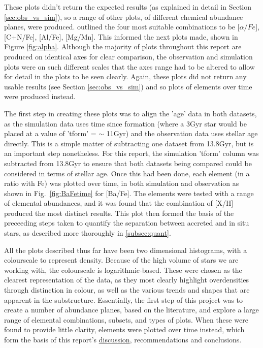 \documentclass[fleqn,usenatbib]{mnras}
\begin{document}
These plots didn't return the expected results (as explained in detail in Section \ref{sec:obs_vs_sim}), so a range of other plots, of different chemical abundance planes, were produced. \citet{Hawkins2015} outlined the four most suitable combinations to be [$\alpha/Fe$], [C+N/Fe], [Al/Fe], [Mg/Mn]. This informed the next plots made, shown in Figure \ref{fig:alpha}. Although the majority of plots throughout this report are produced on identical axes for clear comparison, the observation and simulation plots were on such different scales that the axes range had to be altered to allow for detail in the plots to be seen clearly. Again, these plots did not return any usable results (see Section \ref{sec:obs_vs_sim}) and so plots of elements over time were produced instead. 
 
 The first step in creating these plots was to align the 'age' data in both datasets, as the simulation data uses time since formation (where a 3Gyr star would be placed at a value of 'tform' = $\sim$ 11Gyr) and the observation data uses stellar age directly. This is a simple matter of subtracting one dataset from 13.8Gyr, but is an important step nonetheless. For this report, the simulation 'tform' column was subtracted from 13.8Gyr to ensure that both datasets being compared could be considered in terms of stellar age.  
Once this had been done, each element (in a ratio with Fe) was plotted over time, in both simulation and observation as shown in Fig.~\ref{fig:BaFetime} for [Ba/Fe]. The elements were tested with a range of elemental abundances, and it was found that the combination of [X/H] produced the most distinct results. This plot then formed the basis of the preceeding steps taken to quantify the separation between accreted and in situ stars, as described more thoroughly in \ref{subsec:quant}.  
 
 All the plots described thus far have been two dimensional histograms, with a colourscale to represent density. Because of the high volume of stars we are working with, the colourscale is logarithmic-based. These were chosen as the clearest representation of the data, as they most clearly highlight overdensities through distinction in colour, as well as the various trends and shapes that are apparent in the substructure.  
 Essentially, the first step of this project was to create a number of abundance planes, based on the literature, and explore a large range of elemental combinations, subsets, and types of plots. When these were found to provide little clarity, elements were plotted over time instead, which form the basis of this report's \hyperref[sec:discussion]{discussion}, recommendations and conclusions.
 
\end{document}
